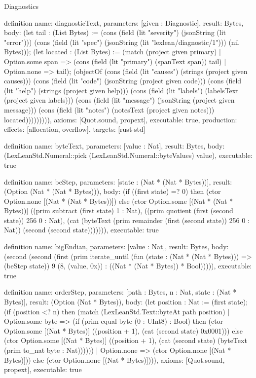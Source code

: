\begin{lexlean}{Diagnostics}
\begin{semanticmodule}
definition{
  name: diagnosticText,
  parameters: [given : Diagnostic],
  result: Bytes,
  body: (let tail : (List Bytes) := (cons (field (lit "severity") (jsonString (lit "error"))) (cons (field (lit "spec") (jsonString (lit "lexlean/diagnostic/1"))) (nil Bytes))); (let located : (List Bytes) := (match (project given primary)
    | Option.some span => (cons (field (lit "primary") (spanText span)) tail)
    | Option.none => tail); (objectOf (cons (field (lit "causes") (strings (project given causes))) (cons (field (lit "code") (jsonString (project given code))) (cons (field (lit "help") (strings (project given help))) (cons (field (lit "labels") (labelsText (project given labels))) (cons (field (lit "message") (jsonString (project given message))) (cons (field (lit "notes") (notesText (project given notes))) located))))))))),
  axioms: [Quot.sound, propext],
  executable: true,
  production: {effects: [allocation, overflow], targets: [rust-std]}
}

definition{
  name: byteText,
  parameters: [value : Nat],
  result: Bytes,
  body: (LexLeanStd.Numeral::pick (LexLeanStd.Numeral::byteValues) value),
  executable: true
}

definition{
  name: beStep,
  parameters: [state : (Nat * (Nat * Bytes))],
  result: (Option (Nat * (Nat * Bytes))),
  body: (if ((first state) =? 0) then (ctor Option.none [(Nat * (Nat * Bytes))]) else (ctor Option.some [(Nat * (Nat * Bytes))] ((prim subtract (first state) 1 : Nat), ((prim quotient (first (second state)) 256 0 : Nat), (cat (byteText (prim remainder (first (second state)) 256 0 : Nat)) (second (second state))))))),
  executable: true
}

definition{
  name: bigEndian,
  parameters: [value : Nat],
  result: Bytes,
  body: (second (second (first (prim iterate_until (fun (state : (Nat * (Nat * Bytes))) => (beStep state)) 9 (8, (value, 0x)) : ((Nat * (Nat * Bytes)) * Bool))))),
  executable: true
}

definition{
  name: orderStep,
  parameters: [path : Bytes, n : Nat, state : (Nat * Bytes)],
  result: (Option (Nat * Bytes)),
  body: (let position : Nat := (first state); (if (position <? n) then (match (LexLeanStd.Text::byteAt path position)
    | Option.some byte => (if (prim equal byte (0 : UInt8) : Bool) then (ctor Option.some [(Nat * Bytes)] ((position + 1), (cat (second state) 0x0001))) else (ctor Option.some [(Nat * Bytes)] ((position + 1), (cat (second state) (byteText (prim to_nat byte : Nat))))))
    | Option.none => (ctor Option.none [(Nat * Bytes)])) else (ctor Option.none [(Nat * Bytes)]))),
  axioms: [Quot.sound, propext],
  executable: true
}


\end{semanticmodule}
\end{lexlean}
